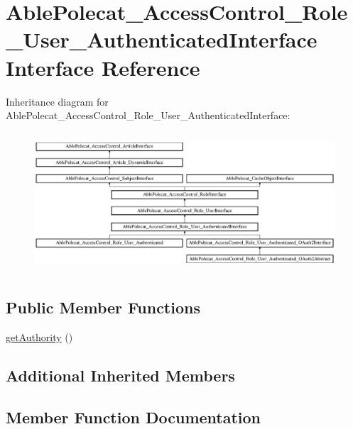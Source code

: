\hypertarget{interface_able_polecat___access_control___role___user___authenticated_interface}{}\section{Able\+Polecat\+\_\+\+Access\+Control\+\_\+\+Role\+\_\+\+User\+\_\+\+Authenticated\+Interface Interface Reference}
\label{interface_able_polecat___access_control___role___user___authenticated_interface}
Inheritance diagram for Able\+Polecat\+\_\+\+Access\+Control\+\_\+\+Role\+\_\+\+User\+\_\+\+Authenticated\+Interface\+:\begin{figure}[H]
\begin{center}
\leavevmode
\includegraphics[height=5.245902cm]{interface_able_polecat___access_control___role___user___authenticated_interface}
\end{center}
\end{figure}
\subsection*{Public Member Functions}
\begin{DoxyCompactItemize}
\item 
\hyperlink{interface_able_polecat___access_control___role___user___authenticated_interface_a1f73860dd14340c5bad9094f0b5b97c2}{get\+Authority} ()
\end{DoxyCompactItemize}
\subsection*{Additional Inherited Members}


\subsection{Member Function Documentation}
\hypertarget{interface_able_polecat___access_control___role___user___authenticated_interface_a1f73860dd14340c5bad9094f0b5b97c2}{}
